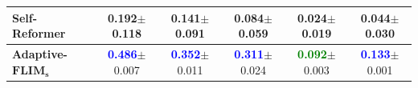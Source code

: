 \documentclass[10pt,twocolumn,twoside]{IEEEtran}
\begin{document}
\begin{table}[htb]
{\begin{tabular}{l|c|c|c|c|c}
    Self-Reformer                           &  0.192$\pm$0.118          & 0.141$\pm$0.091           & 0.084$\pm$0.059           & 0.024$\pm$0.019           & 0.044$\pm$0.030  \\ \hline 
    \textbf{Adaptive-}$\mathbf{FLIM_s}$     &  \textcolor{blue}{\textbf{0.486}}$\pm$0.007 & \textcolor{blue}{\textbf{0.352}}$\pm$0.011  & \textcolor{blue}{\textbf{0.311}}$\pm$0.024  & \textcolor{green}{\textbf{0.092}}$\pm$0.003  & \textcolor{blue}{\textbf{0.133}}$\pm$0.001  \\ \hline
    \end{tabular}
    }
    \label{tab:quantitative-results-splits}
\end{table}

\begin{table}[htb]
 \centering
    \caption{Test set results considering our proposed solution with kernel selection (\textbf{Adaptive-}$\mathbf{FLIM}$), U²Net, Self-Reformer, and DETReg. The two best results for each metric are highlighted in blue and green, respectively.}
\end{table}
\end{document}
